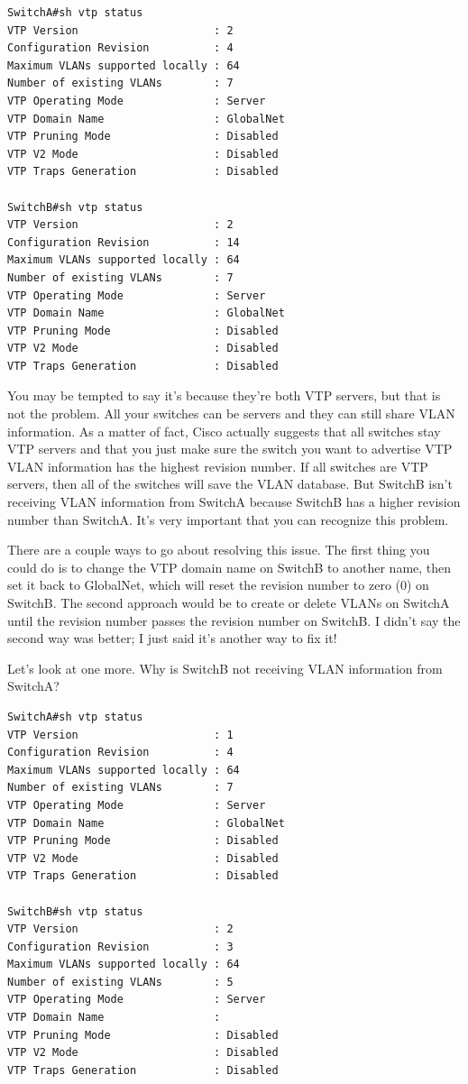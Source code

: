 \begin{verbatim}
SwitchA#sh vtp status
VTP Version                     : 2
Configuration Revision          : 4
Maximum VLANs supported locally : 64
Number of existing VLANs        : 7
VTP Operating Mode              : Server
VTP Domain Name                 : GlobalNet
VTP Pruning Mode                : Disabled
VTP V2 Mode                     : Disabled
VTP Traps Generation            : Disabled
 
SwitchB#sh vtp status
VTP Version                     : 2
Configuration Revision          : 14
Maximum VLANs supported locally : 64
Number of existing VLANs        : 7
VTP Operating Mode              : Server
VTP Domain Name                 : GlobalNet
VTP Pruning Mode                : Disabled
VTP V2 Mode                     : Disabled
VTP Traps Generation            : Disabled
\end{verbatim}

You may be tempted to say it's because they're both VTP servers, but
that is not the problem. All your switches can be servers and they can
still share VLAN information. As a matter of fact, Cisco actually
suggests that all switches stay VTP servers and that you just make sure
the switch you want
to advertise VTP VLAN information has the highest revision number. If
all switches are VTP servers, then all of the switches will save the
VLAN database. But SwitchB isn't receiving VLAN information from SwitchA
because SwitchB has a higher revision number than SwitchA. It's very
important that you can recognize this problem.

There are a couple ways to go about resolving this issue. The first
thing you could do is to change the VTP domain name on SwitchB to
another name, then set it back to GlobalNet, which will reset the
revision number to zero (0) on SwitchB. The second approach would be to
create or delete VLANs on SwitchA until the revision number passes the
revision number on SwitchB. I didn't say the second way was better; I
just said it's another way to fix it!

Let's look at one more. Why is SwitchB not receiving VLAN information
from SwitchA?

\begin{verbatim}
SwitchA#sh vtp status
VTP Version                     : 1
Configuration Revision          : 4
Maximum VLANs supported locally : 64
Number of existing VLANs        : 7
VTP Operating Mode              : Server
VTP Domain Name                 : GlobalNet
VTP Pruning Mode                : Disabled
VTP V2 Mode                     : Disabled
VTP Traps Generation            : Disabled
 
SwitchB#sh vtp status
VTP Version                     : 2
Configuration Revision          : 3
Maximum VLANs supported locally : 64
Number of existing VLANs        : 5
VTP Operating Mode              : Server
VTP Domain Name                 :
VTP Pruning Mode                : Disabled
VTP V2 Mode                     : Disabled
VTP Traps Generation            : Disabled
\end{verbatim}

